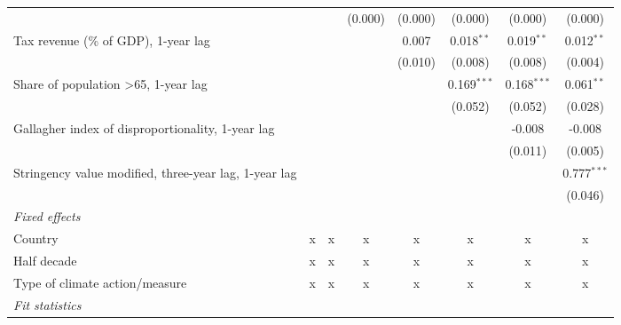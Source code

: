 \begin{table}[htbp]
\begin{tabular}{lccccccc}
                                                                  &              &              & (0.000)      & (0.000) & (0.000)       & (0.000)       & (0.000)\\   
      Tax revenue (\% of GDP), 1-year lag                         &              &              &              & 0.007   & 0.018$^{**}$  & 0.019$^{**}$  & 0.012$^{**}$\\   
                                                                  &              &              &              & (0.010) & (0.008)       & (0.008)       & (0.004)\\   
      Share of population >65, 1-year lag                         &              &              &              &         & 0.169$^{***}$ & 0.168$^{***}$ & 0.061$^{**}$\\   
                                                                  &              &              &              &         & (0.052)       & (0.052)       & (0.028)\\   
      Gallagher index of disproportionality, 1-year lag           &              &              &              &         &               & -0.008        & -0.008\\   
                                                                  &              &              &              &         &               & (0.011)       & (0.005)\\   
      Stringency value modified, three-year lag, 1-year lag       &              &              &              &         &               &               & 0.777$^{***}$\\   
                                                                  &              &              &              &         &               &               & (0.046)\\   
      \emph{Fixed effects}\\
      Country                                                     & x            & x            & x            & x       & x             & x             & x\\  
      Half decade                                                 & x            & x            & x            & x       & x             & x             & x\\  
      Type of climate action/measure                              & x            & x            & x            & x       & x             & x             & x\\  
      \midrule \emph{Fit statistics}\\

\end{tabular}
\end{table}
